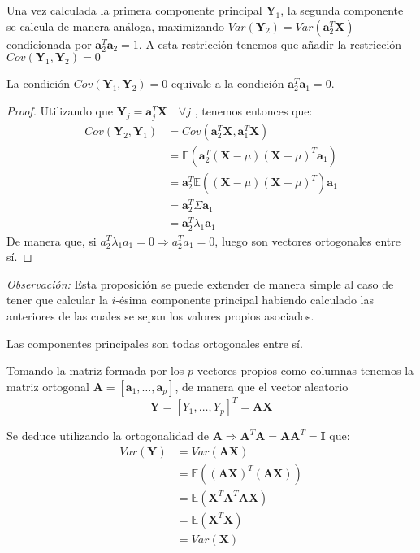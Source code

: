 \noindent Una vez calculada la primera componente principal $\textbf{Y}_1$, la segunda componente se calcula de manera análoga, maximizando $Var(\textbf{Y}_2)=Var(\textbf{a}_2^T\textbf{X})$ condicionada por $\textbf{a}_2^T\textbf{a}_2=1$. A esta restricción tenemos que añadir la restricción $Cov(\textbf{Y}_1,\textbf{Y}_2)=0 $

\begin{propo}
La condición $Cov(\textbf{Y}_1,\textbf{Y}_2)=0 $ equivale a la condición $\textbf{a}_2^T\textbf{a}_1 = 0$.
\begin{proof}
Utilizando que $\textbf{Y}_j=\textbf{a}_j^T \textbf{X}\quad \forall j$ , tenemos entonces que:
\begin{align*}
Cov(\textbf{Y}_2,\textbf{Y}_1)&= Cov (\textbf{a}_2^T\textbf{X},\textbf{a}_1^T\textbf{X})\\ 
&= \mathbb{E}(\textbf{a}_2^T(\textbf{X}-\mu)(\textbf{X}-\mu)^T \textbf{a}_1)\\
&= \textbf{a}_2^T \mathbb{E}((\textbf{X}-\mu)(\textbf{X}-\mu)^T) \textbf{a}_1\\
&= \textbf{a}_2^T \Sigma \textbf{a}_1 \\
&= \textbf{a}_2^T \lambda_1 \textbf{a}_1
\end{align*}
\noindent De manera que, si $a_2^T \lambda_1 a_1 = 0 \Rightarrow a_2^T a_1=0 $, luego son vectores ortogonales entre sí.
\end{proof}
\end{propo}


\noindent \emph{Observación: } Esta proposición se puede extender de manera simple al caso de tener que calcular la $i$-ésima componente principal habiendo calculado las anteriores de las cuales se sepan los valores propios asociados. 

\begin{coro}
Las componentes principales son todas ortogonales entre sí. 
\end{coro}

\noindent Tomando la matriz formada por los $p$ vectores propios como columnas tenemos la matriz ortogonal $\textbf{A}=[\textbf{a}_1,\ldots, \textbf{a}_p]$, de manera que el vector aleatorio 
$$\textbf{Y}=[Y_1,\ldots , Y_p]^T=\textbf{A}\textbf{X}$$

\noindent Se deduce utilizando la ortogonalidad de $\textbf{A}\Rightarrow \textbf{A}^T\textbf{A}=\textbf{A}\textbf{A}^T=\textbf{I}$ que:
\begin{align*}
Var(\textbf{Y})&=Var(\textbf{AX})\\
&=\mathbb{E}((\textbf{AX})^T(\textbf{AX}))\\
&=\mathbb{E}(\textbf{X}^T\textbf{A}^T\textbf{A}\textbf{X})\\
&=\mathbb{E}(\textbf{X}^T\textbf{X})\\
&=Var(\textbf{X})
\end{align*} 

